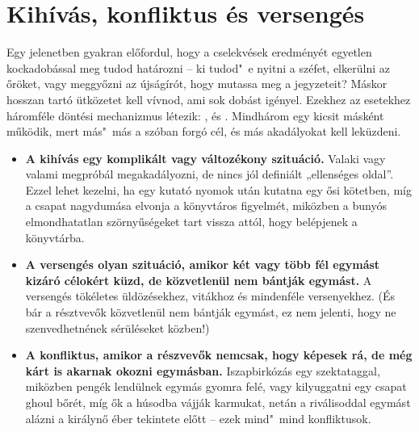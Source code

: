 \chapter{Kihívás, konfliktus és versengés}

Egy jelenetben gyakran előfordul, hogy a cselekvések eredményét egyetlen kockadobással meg tudod határozni – ki tudod"~e nyitni a széfet, elkerülni az őröket, vagy meggyőzni az újságírót, hogy mutassa meg a jegyzeteit? Máskor hosszan tartó ütközetet kell vívnod, ami sok dobást igényel. Ezekhez az esetekhez háromféle döntési mechanizmus létezik: ,  és . Mindhárom egy kicsit másként működik, mert más"~más a szóban forgó cél, és más akadályokat kell leküzdeni.

\begin{itemize}
    \item \textbf{A kihívás egy komplikált vagy változékony szituáció.} Valaki vagy valami megpróbál megakadályozni, de nincs jól definiált „ellenséges oldal”. Ezzel lehet kezelni, ha egy kutató nyomok után kutatna egy ősi kötetben, míg a csapat nagydumása elvonja a könyvtáros figyelmét, miközben a bunyós elmondhatatlan szörnyűségeket tart vissza attól, hogy belépjenek a könyvtárba.
    \item \textbf{A versengés olyan szituáció, amikor két vagy több fél egymást kizáró célokért küzd, de közvetlenül nem bántják egymást.} A versengés tökéletes üldözésekhez, vitákhoz és mindenféle versenyekhez. (És bár a résztvevők közvetlenül nem bántják egymást, ez nem jelenti, hogy ne szenvedhetnének sérüléseket közben!)
    \item \textbf{A konfliktus, amikor a részvevők nemcsak, hogy képesek rá, de még kárt is akarnak okozni egymásban.} Iszapbirkózás egy szektataggal, miközben pengék lendülnek egymás gyomra felé, vagy kilyuggatni egy csapat ghoul bőrét, míg ők a húsodba vájják karmukat, netán a riválisoddal egymást alázni a királynő éber tekintete előtt – ezek mind"~mind konfliktusok.
\end{itemize}
